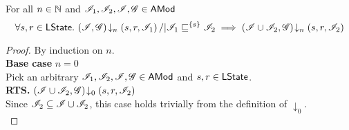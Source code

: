 %
%
%
\begin{lemma}\label{lem:shift-closure}
%
For all $n \in \mathbb{N}$ and $\mathscr{I}_1, \mathscr{I}_2, \mathscr{I}, \mathscr{G} \in \textsf{AMod}$ 
%
\[
	\forall s, r \in \textsf{LState}.\, \left(\mathscr{I}, \mathscr{G}\right) \!\downarrow_{n} \left(s, r, \mathscr{I}_1\right) /| \mathscr{I}_1 \sqsubseteq^{\{s\}} \mathscr{I}_2 \implies \left(\mathscr{I} \cup \mathscr{I}_2, \mathscr{G}\right) \!\downarrow_{n} \left(s, r, \mathscr{I}_2\right)
\]
%
\begin{proof}
By induction on $n$. \\

\noindent\textbf{Base case} $n = 0$\\
Pick an arbitrary $\mathscr{I}_1, \mathscr{I}_2, \mathscr{I}, \mathscr{G} \in \textsf{AMod}$ and $s, r \in \textsf{LState}$. \\
\textbf{RTS. } $\left(\mathscr{I} \cup \mathscr{I}_2, \mathscr{G}\right) \!\downarrow_{0} \left(s, r, \mathscr{I}_2\right)$\\
Since $\mathscr{I}_2 \subseteq \mathscr{I} \cup \mathscr{I}_2$, this case holds trivially from the definition of $\downarrow_0$.\\


\end{proof}
\end{lemma}
